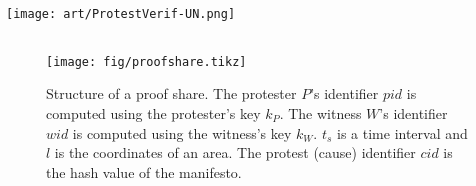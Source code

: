 \begin{columns}[t]
\begin{column}{0.32\linewidth}
    \texttt{[image: art/ProtestVerif-UN.png]}

  \end{column}

\end{columns}

\vfill
\vspace{8cm}

\begin{columns}[t]

  \begin{column}{0.32\linewidth}
    \begin{figure}
      \centering
      \texttt{[image: fig/proofshare.tikz]}
      \caption{%
        Structure of a proof share.
        The protester \(P\)'s identifier \(pid\) is computed using the protester's 
        key \(k_P\).
        The witness \(W\)'s identifier \(wid\) is computed using the witness's key 
        \(k_W\).
        \(t_s\) is a time interval and \(l\) is the coordinates of an area.
        The protest (cause) identifier \(cid\) is the hash value of the manifesto.
      }%
      \label{ProofShare}
    \end{figure}%


\end{column}
\end{columns}
